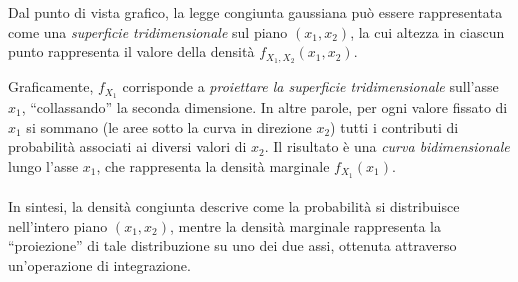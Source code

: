 \begin{figure}[H]
\centering
{}
\end{figure}


Dal punto di vista grafico, la legge congiunta gaussiana può essere rappresentata come una \emph{superficie tridimensionale} sul piano $(x_1,x_2)$, la cui altezza in ciascun punto rappresenta il valore della densità $f_{X_1,X_2}(x_1,x_2)$. 

\medskip
Graficamente, $f_{X_1}$ corrisponde a \emph{proiettare la superficie tridimensionale} 
sull'asse $x_1$, ``collassando'' la seconda dimensione. 
In altre parole, per ogni valore fissato di $x_1$ si sommano 
(le aree sotto la curva in direzione $x_2$) tutti i contributi di probabilità
associati ai diversi valori di $x_2$. Il risultato è una \emph{curva bidimensionale} 
lungo l'asse $x_1$, che rappresenta la densità marginale $f_{X_1}(x_1)$.\\
\\
In sintesi, la densità congiunta descrive come la probabilità si distribuisce 
nell'intero piano $(x_1,x_2)$, mentre la densità marginale rappresenta 
la ``proiezione'' di tale distribuzione su uno dei due assi, ottenuta 
attraverso un'operazione di integrazione.

